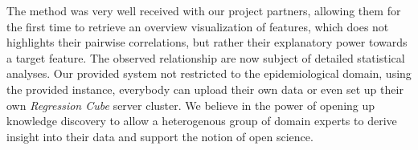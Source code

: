 \documentclass[journal]{style/vgtc} 			          %
\newcommand{\com}[1]{\textcolor{orange}{\uline{#1}}}
\begin{document}
The method was very well received with our project partners, allowing them for the first time to retrieve an overview visualization of features, which does not highlights their pairwise correlations, but rather their explanatory power towards a target feature.
The observed relationship are now subject of detailed statistical analyses.
Our provided system not restricted to the epidemiological domain, using the provided instance, everybody can upload their own data or even set up their own \emph{Regression Cube} server cluster.
We believe in the power of opening up knowledge discovery to allow a heterogenous group of domain experts to derive insight into their data and support the notion of open science.
\clearpage
\newpage


\end{document}
